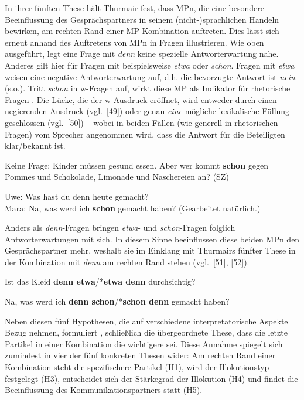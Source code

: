 In ihrer fünften These hält Thurmair fest, dass MPn, die eine besondere Be\-einflussung des Gesprächspartners in seinem (nicht-)sprachlichen Handeln bewirken, am rechten Rand einer MP-Kombination auftreten. Dies lässt sich erneut anhand des Auftretens von MPn in Fragen illustrieren. Wie oben ausgeführt, legt eine Frage  mit \textit{denn} keine spezielle Antworterwartung nahe. Anderes gilt hier für Fragen mit beispielsweise \textit{etwa} oder \textit{schon}. Fragen mit \textit{etwa} weisen eine ne\-gative Antworterwartung auf, d.h. die bevorzugte Antwort ist \textit{nein} (s.o.). Tritt \textit{schon} in w-Fragen  auf, wirkt diese MP als Indikator für rhetorische Fragen . Die Lücke, die der w-Ausdruck eröffnet, wird entweder durch einen negierenden Ausdruck (vgl.\ \ref{49}) oder genau \emph{eine} mögliche lexikalische Füllung geschlossen (vgl.\ \ref{50}) – wobei in beiden Fällen (wie generell in rhetorischen Fragen) vom Sprecher angenommen wird, dass die Antwort für die Beteiligten klar/bekannt ist.

\begin{exe}
	\ex\label{49} 
	Keine Frage: Kinder müssen gesund essen. Aber wer kommt \textbf{schon} gegen Pommes
 	und Schokolade, Limonade und Naschereien an? (SZ)
\end{exe}
	
\begin{exe}
	\ex\label{50} 
		Uwe: Was hast du denn heute gemacht? \\
		Mara: Na, was werd ich \textbf{schon} gemacht haben? (Gearbeitet natürlich.)
			\newline
			\hbox{}\hfill\hbox{\citet[154]{Thurmair1989}}	
\end{exe}
Anders als \textit{denn}-Fragen bringen \textit{etwa}- und \textit{schon}-Fragen folglich Antworterwar\-tungen mit sich. In diesem Sinne beeinflussen diese beiden MPn den Gesprächspartner mehr, weshalb sie im Einklang mit Thurmairs fünfter These in der Kombination mit \textit{denn} am rechten Rand stehen (vgl.\ \ref{51}, \ref{52}).

\begin{exe}
	\ex\label{51} 
	Ist das Kleid \textbf{denn etwa}/*\textbf{etwa denn} durchsichtig?
\end{exe}
\begin{exe}
	\ex\label{52} 
	Na, was werd ich \textbf{denn schon}/*\textbf{schon denn} gemacht haben?
\end{exe}	
Neben diesen fünf Hypothesen, die auf verschiedene interpretatorische Aspekte Bezug nehmen, formuliert \citet[289]{Thurmair1989}, \citeyear[31]{Thurmair1991} schließlich die übergeordnete These, dass die letzte Partikel in einer Kombination die wichtigere sei. Diese Annahme spiegelt sich zumindest in vier der fünf konkreten Thesen wider: Am rechten Rand einer Kombination steht die spezifischere Partikel (H1), wird der Illokutionstyp festgelegt (H3), entscheidet sich der Stärkegrad der Illokution (H4) und findet die Beeinflussung des Kommunikationspartners statt (H5).

